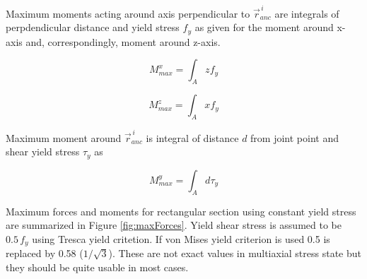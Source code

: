Maximum moments acting around axis perpendicular to $\vec{r}_{anc}^{\,i} $
are integrals of perpdendicular distance 
and yield stress $f_y$ as given for the moment around x-axis and,
correspondingly, moment around z-axis.

\begin{equation} \label{eq:Mx}
M_{max}^x= \int_A z f_y
\end{equation}

\begin{equation} \label{eq:Mz}
M_{max}^z= \int_A x f_y
\end{equation}

Maximum moment around $\vec{r}_{anc}^{\,i} $
is integral of distance $d$ from joint point
and shear yield stress $\tau_y$ as 

\begin{equation} \label{eq:My}
M_{max}^y= \int_A d \tau_y
\end{equation}

Maximum forces and moments for 
rectangular section using constant yield stress
are summarized in Figure \ref{fig:maxForces}.
Yield shear stress is assumed to be $ 0.5\, f_y$ using Tresca yield critetion.
If von Mises yield criterion is used 0.5 is replaced by 0.58 ($1/\sqrt{3}$).
These are not exact values in multiaxial stress state but they
should be quite usable in most cases.



